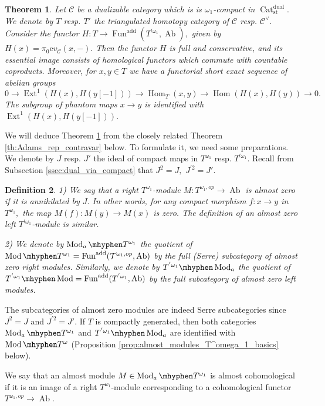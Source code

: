 \documentclass[11pt,leqno]{amsart}
\newtheorem{theo}{Theorem}[section]
\newtheorem{defi}[theo]{Definition}
\numberwithin{equation}{section}
\def\Hom{\operatorname{Hom}}
\newcommand{\tens}[1]{%
  \mathbin{\mathop{\otimes}\displaylimits_{#1}}%
}
\newcommand{\hy}{\mhyphen}
\newcommand{\Cat}{\operatorname{Cat}}
\newcommand{\st}{\operatorname{st}}
\newcommand{\dual}{\operatorname{dual}}
\newcommand{\ev}{\mathrm ev}
\newcommand{\cC}{{\mathcal C}}
\newcommand{\cT}{{\mathcal T}}
\newcommand{\Fun}{\operatorname{Fun}}
\newcommand{\Ab}{\operatorname{Ab}}
\newcommand{\Ext}{\operatorname{Ext}}
\newcommand{\add}{\operatorname{add}}
\newcommand{\Mod}{\operatorname{Mod}}
\begin{document}
\begin{theo}\label{th:Adams_rep_covar}
Let $\cC$ be a dualizable category which is is $\omega_1$-compact in $\Cat_{\st}^{\dual}.$ We denote by $T$ resp. $T'$ the triangulated homotopy category of $\cC$ resp. $\cC^{\vee}.$ Consider the functor $H:T\to \Fun^{\add}(T^{'\omega_1},\Ab),$ given by $H(x)=\pi_0\ev_{\cC}(x,-).$ Then the functor $H$ is full and conservative, and its essential image consists of homological functors which commute with countable coproducts. Moreover, for $x,y\in T$ we have a functorial short exact sequence of abelian groups
\begin{equation*}
0\to \Ext^1(H(x),H(y[-1]))\to \Hom_T(x,y)\to \Hom(H(x),H(y))\to 0.
\end{equation*}
The subgroup of phantom maps $x\to y$ is identified with $\Ext^1(H(x),H(y[-1])).$
\end{theo} 

We will deduce Theorem \ref{th:Adams_rep_covar} from the closely related Theorem \ref{th:Adams_rep_contravar} below. To formulate it, we need some preparations. We denote by $J$ resp. $J'$ the ideal of compact maps in $T^{\omega_1}$ resp. $T^{'\omega_1}.$ Recall from Subsection \ref{ssec:dual_via_compact} that $J^2=J,$ $J^{'2}=J'.$

\begin{defi}1) We say that a right $T^{\omega_1}$-module $M:T^{\omega_1,op}\to\Ab$ is almost zero if it is annihilated by $J.$ In other words, for any compact morphism $f:x\to y$ in $T^{\omega_1},$ the map $M(f):M(y)\to M(x)$ is zero. The definition of an almost zero left $T^{'\omega_1}$-module is similar.

2) We denote by $\Mod_a\hy T^{\omega_1}$ the quotient of $\Mod\hy T^{\omega_1}=\Fun^{\add}(\cT^{\omega_1,op},\Ab)$ by the full (Serre) subcategory of almost zero right modules. Similarly, we denote by  $T^{'\omega_1}\hy\Mod_a$ the quotient of $T^{'\omega_1}\hy\Mod=\Fun^{\add}(T^{'\omega_1},\Ab)$ by the full subcategory of almost zero left modules.\end{defi}

The subcategories of almost zero modules are indeed Serre subcategories since $J^2=J$ and $J^{'2}=J'.$ If $T$ is compactly generated, then both categories $\Mod_a\hy T^{\omega_1}$ and $T^{'\omega_1}\hy\Mod_a$ are identified with $\Mod\hy T^{\omega}$ (Proposition \ref{prop:almost_modules_T^omega_1_basics} below). 

We say that an almost module $M\in\Mod_a\hy T^{\omega_1}$ is almost cohomological if it is an image of a right $T^{\omega_1}$-module corresponding to a cohomological functor $T^{\omega_1,op}\to\Ab.$ 
\end{document}
